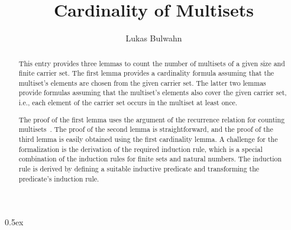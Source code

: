 \documentclass[11pt,a4paper]{article}
\begin{document}
\title{Cardinality of Multisets}
\author{Lukas Bulwahn}
\maketitle

\begin{abstract}

This entry provides three lemmas to count the number of multisets of a
given size and finite carrier set.
The first lemma provides a cardinality formula assuming that the
multiset's elements are chosen from the given carrier set. 
The latter two lemmas provide formulas assuming that the multiset's
elements also cover the given carrier set, i.e., each element of the carrier
set occurs in the multiset at least once.

The proof of the first lemma uses the argument of the recurrence relation for
counting multisets~\cite{wikipedia:Multiset}. The proof of the second lemma is
straightforward, and the proof of the third lemma is easily obtained
using the first cardinality lemma.  
A challenge for the formalization is the derivation of the required
induction rule, which is a special combination of the induction
rules for finite sets and natural numbers. The induction rule is derived
by defining a suitable inductive predicate and transforming the predicate's
induction rule.

\end{abstract}

\tableofcontents

\parindent 0pt\parskip 0.5ex



\nocite{*}



\end{document}
